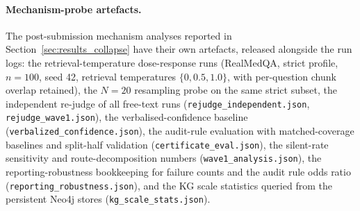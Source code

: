 \paragraph{Mechanism-probe artefacts.}
The post-submission mechanism analyses reported in
Section~\ref{sec:results_collapse} have their own artefacts, released
alongside the run logs: the retrieval-temperature dose-response runs
(RealMedQA, strict profile, $n=100$, seed 42, retrieval temperatures
$\{0, 0.5, 1.0\}$, with per-question chunk overlap retained), the
$N{=}20$ resampling probe on the same strict subset, the independent
re-judge of all free-text runs
(\texttt{rejudge\_independent.json}, \texttt{rejudge\_wave1.json}), the
verbalised-confidence baseline (\texttt{verbalized\_confidence.json}),
the audit-rule evaluation with matched-coverage baselines and split-half
validation (\texttt{certificate\_eval.json}), the silent-rate sensitivity
and route-decomposition numbers (\texttt{wave1\_analysis.json}), the
reporting-robustness bookkeeping for failure counts and the audit rule
odds ratio (\texttt{reporting\_robustness.json}), and the
KG scale statistics queried from the persistent Neo4j stores
(\texttt{kg\_scale\_stats.json}).
